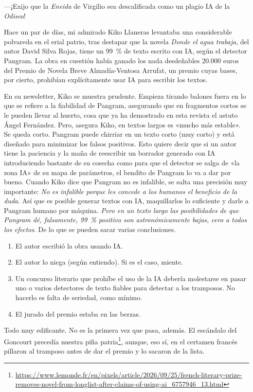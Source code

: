 \documentclass[11pt,a4paper]{article}
\begin{document}
---¡Exijo que la \emph{Eneida} de Virgilio sea descalificada como un plagio IA de la \emph{Odisea}!

Hace un par de días, mi admirado Kiko Llaneras levantaba una considerable polvareda en el erial patrio, tras destapar que la novela \emph{Donde el agua trabaja}, del autor David Silva Rojas, tiene un 99~\% de texto escrito con IA, según el detector Pangram. La obra en cuestión había ganado los nada desdeñables 20.000 euros del Premio de Novela Breve Almadía-Ventosa Arrufat, un premio cuyas bases, por cierto, prohibían explícitamente usar IA para escribir los textos.

En su newsletter, Kiko se muestra prudente. Empieza tirando balones fuera en lo que se refiere a la fiabilidad de Pangram, asegurando que en fragmentos cortos se le pueden llevar al huerto, cosa que ya ha demostrado en esta revista el astuto Ángel Fernández. Pero, asegura Kiko, en textos largos es «mucho más estable». Se queda corto. Pangram puede chirriar en un texto corto (muy corto) y está diseñado para minimizar los falsos positivos. Esto quiere decir que si un autor tiene la paciencia y la maña de reescribir un borrador generado con IA introduciendo bastante de su cosecha como para que el detector se salga de «la zona IA» de su mapa de parámetros, el bendito de Pangram lo va a dar por bueno. Cuando Kiko dice que Pangram no es infalible, se salta una precisión muy importante: \emph{No es infalible porque les concede a los humanos el beneficio de la duda}. Así que es posible generar textos con IA, maquillarlos lo suficiente y darle a Pangram humano por máquina. \emph{Pero en un texto largo las posibilidades de que Pangram dé, falsamente, 99~\% positivo son astronómicamente bajas, cero a todos los efectos}. De lo que se pueden sacar varias conclusiones.

\begin{enumerate}
\item El autor escribió la obra usando IA.
\item El autor lo niega (según entiendo). Si es el caso, miente.
\item Un concurso literario que prohíbe el uso de la IA debería molestarse en pasar uno o varios detectores de texto fiables para detectar a los tramposos. No hacerlo es falta de seriedad, como mínimo.
\item El jurado del premio estaba en las berzas.
\end{enumerate}

Todo muy edificante. No es la primera vez que pasa, además. El escándalo del Goncourt precedía nuestra pifia patria\footnote{\url{https://www.lemonde.fr/en/pixels/article/2026/09/25/french-literary-prize-removes-novel-from-longlist-after-claims-of-using-ai_6757946_13.html}}, aunque, eso sí, en el certamen francés pillaron al tramposo antes de dar el premio y lo sacaron de la lista.
\end{document}
